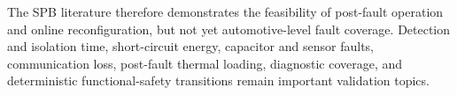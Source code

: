 The SPB literature therefore demonstrates the feasibility of
post-fault operation and online reconfiguration, but not yet
automotive-level fault coverage. Detection and isolation time,
short-circuit energy, capacitor and sensor faults, communication loss,
post-fault thermal loading, diagnostic coverage, and deterministic
functional-safety transitions remain important validation topics.
